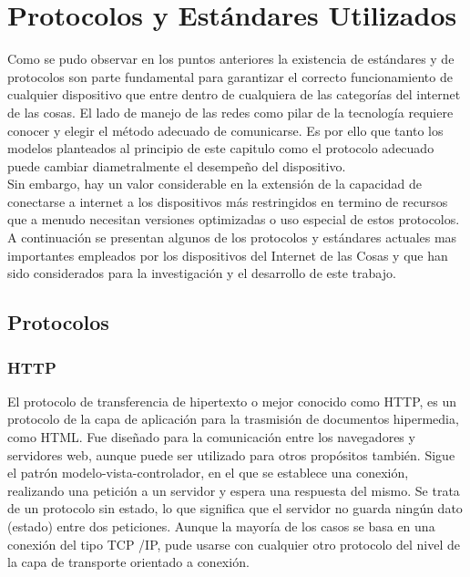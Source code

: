 \section{Protocolos y Estándares Utilizados}
Como se pudo observar en los puntos anteriores la existencia de estándares y de protocolos son parte fundamental para garantizar el correcto funcionamiento de cualquier dispositivo que entre dentro de cualquiera de las categorías del internet de las cosas. El lado de manejo de las redes como pilar de la tecnología requiere conocer y elegir el método adecuado de comunicarse. Es por ello que tanto los modelos planteados al principio de este capitulo\cite{rfc7452} como el protocolo adecuado puede cambiar diametralmente el desempeño del dispositivo.\\

Sin embargo, hay un valor considerable en la extensión de la capacidad de conectarse a internet a los dispositivos más restringidos en termino de recursos que a menudo necesitan versiones optimizadas o uso especial de estos protocolos. A continuación se presentan algunos de los protocolos y estándares actuales mas importantes empleados por los dispositivos del Internet de las Cosas y que han sido considerados para la investigación y el desarrollo de este trabajo.

\subsection{Protocolos}
\subsubsection{HTTP}
El protocolo de transferencia de hipertexto o mejor conocido como HTTP, es un protocolo de la capa de aplicación para la trasmisión de documentos hipermedia, como HTML. Fue diseñado para la comunicación entre los navegadores y servidores web, aunque puede ser utilizado para otros propósitos también. Sigue el patrón modelo-vista-controlador, en el que se establece una conexión, realizando una petición a un servidor y espera una respuesta del mismo. Se trata de un protocolo sin estado, lo que significa que el servidor no guarda ningún dato (estado) entre dos peticiones. Aunque la mayoría de los casos se basa en una conexión del tipo TCP /IP, pude usarse con cualquier otro protocolo del nivel de la capa de transporte orientado a conexión.\cite{mozillahttp}\\

